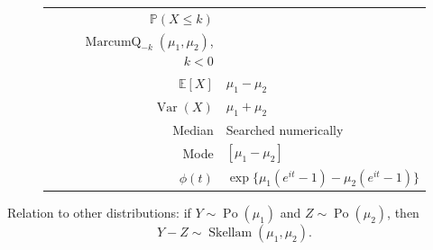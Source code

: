 \documentclass[a4paper,11pt]{article}
\theoremstyle{plain}
\theoremstyle{definition}
\newcommand{\ME}{\mathbb{E}}
\newcommand{\MP}{\mathbb{P}}
\newcommand{\Var}{\operatorname{Var}}
\begin{document}
\begin{figure}[!htb]
\begin{minipage}{0.4\textwidth}
\begin{tabular}{| r | l |}
				\hline
				$\MP(X \leq k)$ & \pbox{\linewidth}{$\operatorname{MarcumP}_{k+1}(\mu_2, \mu_1)$, $k \geq 0$ \\ $\operatorname{MarcumQ}_{-k}(\mu_1, \mu_2)$, $k < 0$ } \\
				\hline
				$\ME[X]$ & $ \mu_1-\mu_2$ \\
				\hline
				$\Var(X)$ & $\mu_1+\mu_2$ \\
				\hline
				Median & Searched numerically \\
				\hline
				Mode & $[ \mu_1-\mu_2] $ \\
				\hline
				$\phi(t)$ & $ \exp \{ \mu_1(e^{it}-1) - \mu_2(e^{it}-1) \}  $ \\
				\hline
			\end{tabular}
		\end{minipage}
	\end{figure}
	Relation to other distributions: if $Y \sim \operatorname{Po}(\mu_1)$ and $Z \sim \operatorname{Po}(\mu_2)$, then
	\[
	Y - Z \sim \operatorname{Skellam}(\mu_1, \mu_2).
	\]
	
	\pagebreak
\end{document}
